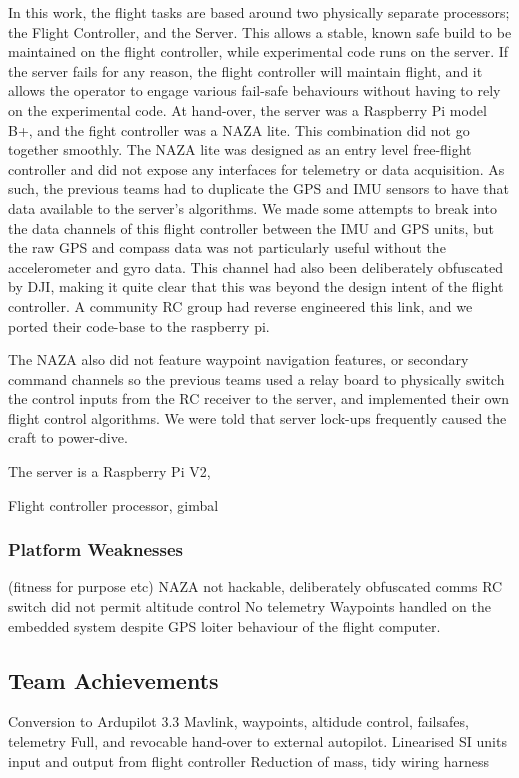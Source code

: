 \documentclass[a4paper, 11pt, titlepage]{article}
\begin{document}
			In this work, the flight tasks are based around two physically separate processors; the Flight Controller, and the Server. This allows a stable, known safe build to be maintained on the flight controller, while experimental code runs on the server. If the server fails for any reason, the flight controller will maintain flight, and it allows the operator to engage various fail-safe behaviours without having to rely on the experimental code.
			At hand-over, the server was a Raspberry Pi model B+, and the fight controller was a NAZA lite.
			This combination did not go together smoothly. The NAZA lite was designed as an entry level free-flight controller and did not expose any interfaces for telemetry or data acquisition.  As such, the previous teams had to duplicate the GPS and IMU sensors to have that data available to the server's algorithms.  We made some attempts to break into the data channels of this flight controller between the IMU and GPS units, but the raw GPS and compass data was not particularly useful without the accelerometer and gyro data.  This channel had also been deliberately obfuscated by DJI, making it quite clear that this was beyond the design intent of the flight controller.  A community RC group had reverse engineered this link, and we ported their code-base to the raspberry pi.

			The NAZA also did not feature waypoint navigation features, or secondary command channels so the previous teams used a relay board to physically switch the control inputs from the RC receiver to the server, and implemented their own flight control algorithms.  We were told that server lock-ups frequently caused the craft to power-dive.
			



			The server is a Raspberry Pi V2,

			Flight controller
			 processor, gimbal
		\subsubsection{Platform Weaknesses}
			(fitness for purpose etc)
			NAZA not hackable, deliberately obfuscated comms
			RC switch did not permit altitude control
			No telemetry
			Waypoints handled on the embedded system despite GPS loiter behaviour of the flight computer.


	\subsection{Team Achievements}
		Conversion to Ardupilot 3.3
		Mavlink, waypoints, altidude control, failsafes, telemetry
		Full, and revocable hand-over to external autopilot.
		Linearised SI units input and output from flight controller
		Reduction of mass, tidy wiring harness
		
\end{document}
